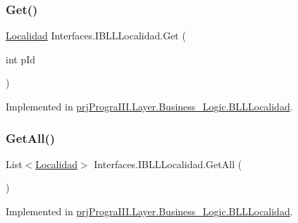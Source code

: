 \subsubsection{\texorpdfstring{Get()}{Get()}}
{\footnotesize\ttfamily \hyperlink{classprj_progra_i_i_i_1_1_layer_1_1_entities_1_1_localidad}{Localidad} Interfaces.\+I\+B\+L\+L\+Localidad.\+Get (\begin{DoxyParamCaption}\item[{int}]{p\+Id }\end{DoxyParamCaption})}



Implemented in \hyperlink{classprj_progra_i_i_i_1_1_layer_1_1_business___logic_1_1_b_l_l_localidad_a812546114fa49a4ca4ea9295d0d9e62b}{prj\+Progra\+I\+I\+I.\+Layer.\+Business\+\_\+\+Logic.\+B\+L\+L\+Localidad}.

\hypertarget{interface_interfaces_1_1_i_b_l_l_localidad_afc2e7478f3ffcee4730c47a9cfb0cfca}{}\label{interface_interfaces_1_1_i_b_l_l_localidad_afc2e7478f3ffcee4730c47a9cfb0cfca} 
\subsubsection{\texorpdfstring{Get\+All()}{GetAll()}}
{\footnotesize\ttfamily List$<$\hyperlink{classprj_progra_i_i_i_1_1_layer_1_1_entities_1_1_localidad}{Localidad}$>$ Interfaces.\+I\+B\+L\+L\+Localidad.\+Get\+All (\begin{DoxyParamCaption}{ }\end{DoxyParamCaption})}



Implemented in \hyperlink{classprj_progra_i_i_i_1_1_layer_1_1_business___logic_1_1_b_l_l_localidad_a0d66ff6caddf671534b300fb5ce2c3df}{prj\+Progra\+I\+I\+I.\+Layer.\+Business\+\_\+\+Logic.\+B\+L\+L\+Localidad}.

